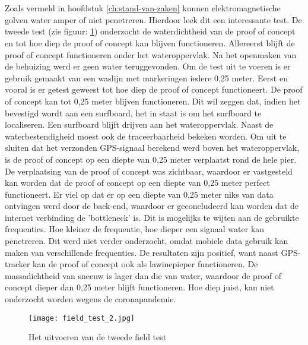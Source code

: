 \section{}
Zoals vermeld in hoofdstuk \ref{ch:stand-van-zaken} kunnen elektromagnetische golven water amper of niet penetreren. Hierdoor leek dit een interessante test.
\newline
De tweede test (zie figuur: \ref{fig:field_test_2}) onderzocht de waterdichtheid van de proof of concept en tot hoe diep de proof of concept kan blijven functioneren. Allereerst blijft de proof of concept functioneren onder het wateroppervlak. Na het openmaken van de behuizing werd er geen water teruggevonden. Om de test uit te voeren is er gebruik gemaakt van een waslijn met markeringen iedere 0,25 meter. 
\newline
Eerst en vooral is er getest geweest tot hoe diep de proof of concept functioneert. De proof of concept kan tot 0,25 meter blijven functioneren. Dit wil zeggen dat, indien het bevestigd wordt aan een surfboard, het in staat is om het surfboard te localiseren. Een surfboard blijft drijven aan het wateroppervlak. Naast de waterbestendigheid moest ook de traceerbaarheid bekeken worden. Om uit te sluiten dat het verzonden GPS-signaal berekend werd boven het wateroppervlak, is de proof of concept op een diepte van 0,25 meter verplaatst rond de hele pier. De verplaatsing van de proof of concept was zichtbaar, waardoor er vastgesteld kan worden dat de proof of concept op een diepte van 0,25 meter perfect functioneert. 
\newline
Er viel op dat er op een diepte van 0,25 meter niks van data ontvingen werd door de back-end, waardoor er geconcludeerd kan worden dat de internet  verbinding de 'bottleneck' is. Dit is mogelijks te wijten aan de gebruikte frequenties. Hoe kleiner de frequentie, hoe dieper een signaal water kan penetreren. Dit werd niet verder onderzocht, omdat mobiele data gebruik kan maken van verschillende frequenties.
\newline
De resultaten zijn positief, want naast GPS-tracker kan de proof of concept ook als lawinepieper functioneren. De massadichtheid van sneeuw is lager dan die van water, waardoor de proof of concept dieper dan 0,25 meter blijft functioneren. Hoe diep juist, kan niet onderzocht worden wegens de coronapandemie. 
\begin{figure}
	\texttt{[image: field\_test\_2.jpg]}
	\caption{Het uitvoeren van de tweede field test}
	\label{fig:field_test_2}
\end{figure}